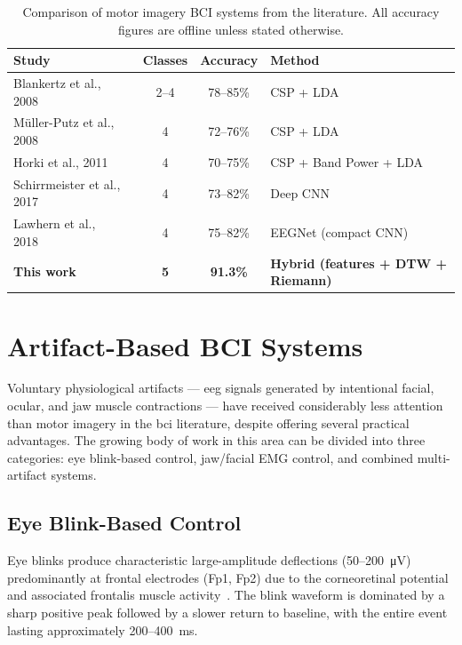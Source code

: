 \begin{table}[htbp]
\centering
\caption{Comparison of motor imagery BCI systems from the literature.
All accuracy figures are offline unless stated otherwise.}
\label{tab:mi_comparison}
\renewcommand{\arraystretch}{1.3}
\begin{tabular}{p{2.8cm} c c p{2.8cm}}
\toprule
\textbf{Study} & \textbf{Classes} & \textbf{Accuracy} & \textbf{Method} \\
\midrule
Blankertz et al., 2008~\cite{blankertz2008csp}
    & 2--4 & 78--85\% & CSP + LDA \\
M\"{u}ller-Putz et al., 2008~\cite{mullerputz2008prosthetic}
    & 4 & 72--76\% & CSP + LDA \\
Horki et al., 2011~\cite{horki2011combined}
    & 4 & 70--75\% & CSP + Band Power + LDA \\
Schirrmeister et al., 2017~\cite{schirrmeister2017deep}
    & 4 & 73--82\% & Deep CNN \\
Lawhern et al., 2018~\cite{lawhern2018eegnet}
    & 4 & 75--82\% & EEGNet (compact CNN) \\
\textbf{This work}
    & \textbf{5} & \textbf{91.3\%} & \textbf{Hybrid (features + DTW + Riemann)} \\
\bottomrule
\end{tabular}
\end{table}

\section{Artifact-Based BCI Systems}
\label{sec:rw_artifact}

Voluntary physiological artifacts — \acrshort{eeg} signals generated
by intentional facial, ocular, and jaw muscle contractions — have
received considerably less attention than motor imagery in the
\acrshort{bci} literature, despite offering several practical
advantages. The growing body of work in this area can be divided
into three categories: eye blink-based control, jaw/facial EMG
control, and combined multi-artifact systems.

\subsection{Eye Blink-Based Control}

Eye blinks produce characteristic large-amplitude deflections
(50--200~\si{\micro\volt}) predominantly at frontal electrodes
(Fp1, Fp2) due to the corneoretinal potential and associated
frontalis muscle activity~\cite{usakli2010artifact}. The blink
waveform is dominated by a sharp positive peak followed by a slower
return to baseline, with the entire event lasting approximately
200--400~ms.

